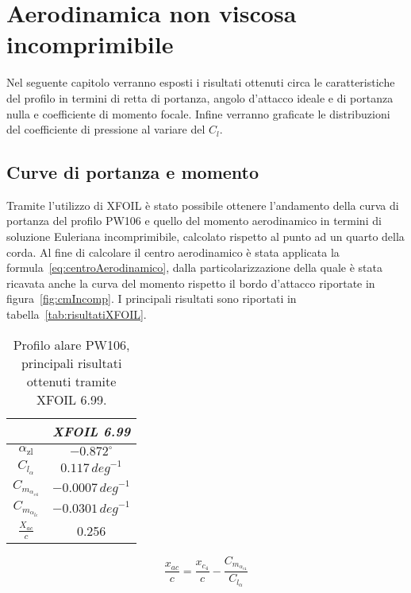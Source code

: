 \chapter{Aerodinamica non viscosa incomprimibile}
Nel seguente capitolo verranno esposti i risultati ottenuti circa le caratteristiche del profilo in termini di retta di portanza, angolo d’attacco ideale e di portanza nulla e coefficiente di momento focale. Infine verranno graficate le distribuzioni del coefficiente di pressione al variare del $C_l $.
\section{Curve di portanza e momento}
Tramite l’utilizzo di XFOIL è stato possibile ottenere l’andamento della curva di portanza del profilo PW106 e quello del momento aerodinamico in termini di soluzione Euleriana incomprimibile, calcolato rispetto al punto ad un quarto della corda. Al fine di calcolare il centro aerodinamico è stata applicata la formula~\vref{eq:centroAerodinamico}, dalla particolarizzazione della quale è stata ricavata anche la curva del momento rispetto il bordo d'attacco riportate in figura~\vref{fig:cmIncomp}. I principali risultati sono riportati in tabella~\vref{tab:risultatiXFOIL}.


\renewcommand\arraystretch{1.4} 
\begin{table} [!h]\centering {}
\begin{tabular}{c| c}
\toprule
  &  \emph{XFOIL 6.99} \\ 
\midrule
${\alpha}_{\mathrm{zl}}$ & $-0.872^\circ$ \\
${C_{l_{\alpha}}}$ & $0.117 \, \si{deg}^{-1}$ \\
${ C_{m_{{\alpha}_{c4}}}}$ &$-0.0007 \, \si{deg}^{-1}$  \\ 
${ C_{m_{{\alpha}_{le}}}}$ &$-0.0301 \, \si{deg}^{-1}$\\
 $\frac{X_{ac}}{c}$  & 0.256\\
\bottomrule
\end{tabular}
\caption {Profilo alare PW106, principali risultati ottenuti tramite XFOIL 6.99.}
\label{tab:risultatiXFOIL}
\end{table}

\begin{equation}
\frac {x_{ac}}{c}=\frac {x_{c_4}}{c} - \frac{ C_{m_{{\alpha}_{c4}}}}{C_{l_{\alpha}}}
\label{eq:centroAerodinamico}
\end{equation}


